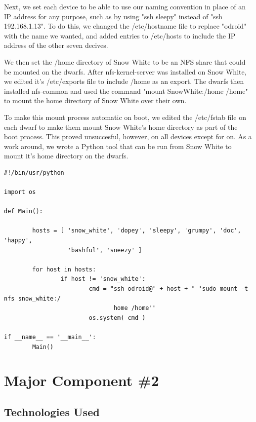 Next, we set each device to be able to use our naming convention in place of an IP address for any purpose, such as by using "ssh sleepy" instead of "ssh 192.168.1.13". To do this, we changed the /etc/hostname file to replace "odroid" with the name we wanted, and added entries to /etc/hosts to include the IP address of the other seven decives. 

We then set the /home directory of Snow White to be an NFS share that could be mounted on the dwarfs. After nfs-kernel-server was installed on Snow White, we edited it's /etc/exports file to include /home as an export. The dwarfs then installed nfs-common and used the command "mount SnowWhite:/home /home" to mount the home directory of Snow White over their own.

To make this mount process automatic on boot, we edited the /etc/fstab file on each dwarf to make them mount Snow White's home directory as part of the boot process. This proved unsuccesful, however, on all devices except for on. As a work around, we wrote a Python tool that can be run from Snow White to mount it's home directory on the dwarfs.

\begin{lstlisting}
#!/bin/usr/python

import os

def Main():

        hosts = [ 'snow_white', 'dopey', 'sleepy', 'grumpy', 'doc', 'happy',
 				  'bashful', 'sneezy' ]

        for host in hosts:
                if host != 'snow_white':
                        cmd = "ssh odroid@" + host + " 'sudo mount -t nfs snow_white:/
							   home /home'"
                        os.system( cmd )

if __name__ == '__main__':
        Main()
\end{lstlisting}

\section{Major Component \#2 }

\subsection{Technologies  Used}

